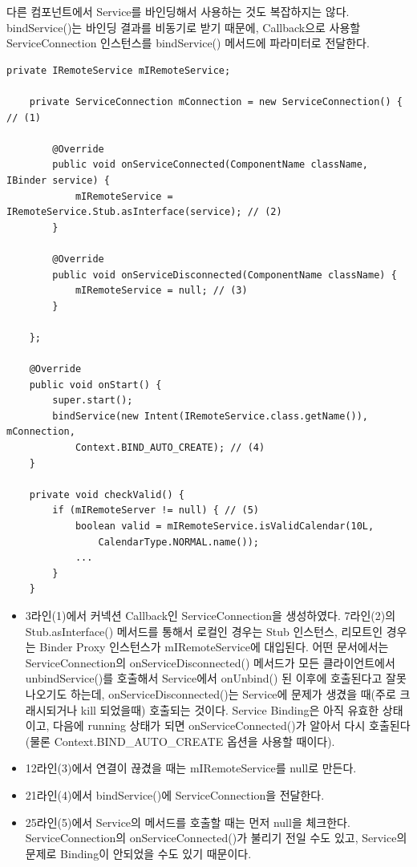 다른 컴포넌트에서 Service를 바인딩해서 사용하는 것도 복잡하지는 않다. 
bindService()는 바인딩 결과를 비동기로 받기 때문에, Callback으로 사용할 ServiceConnection 인스턴스를 bindService() 메서드에 파라미터로 전달한다.
\begin{lstlisting}[frame=single]
	private IRemoteService mIRemoteService;

	private ServiceConnection mConnection = new ServiceConnection() { // (1)

		@Override
    	public void onServiceConnected(ComponentName className, IBinder service) {
        	mIRemoteService = IRemoteService.Stub.asInterface(service); // (2)
    	}

    	@Override
    	public void onServiceDisconnected(ComponentName className) {
        	mIRemoteService = null; // (3)
    	}
    	
	};

	@Override
	public void onStart() {
		super.start();
		bindService(new Intent(IRemoteService.class.getName()), mConnection,
			Context.BIND_AUTO_CREATE); // (4)
	}
	
	private void checkValid() {
		if (mIRemoteServer != null) { // (5)
			boolean valid = mIRemoteService.isValidCalendar(10L,
				CalendarType.NORMAL.name());
			...
		}	
	}
\end{lstlisting}
\begin{itemize}
\item 3라인(1)에서 커넥션 Callback인 ServiceConnection을 생성하였다. 
7라인(2)의 Stub.asInterface() 메서드를 통해서 로컬인 경우는 Stub 인스턴스, 리모트인 경우는 Binder Proxy 인스턴스가 mIRemoteService에 대입된다.
어떤 문서에서는 ServiceConnection의 onServiceDisconnected() 메서드가 모든 클라이언트에서 unbindService()를 호출해서 Service에서 onUnbind() 된 이후에 호출된다고 잘못 나오기도 하는데, onServiceDisconnected()는 Service에 문제가 생겼을 때(주로 크래시되거나 kill 되었을때) 호출되는 것이다.
Service Binding은 아직 유효한 상태이고, 다음에 running 상태가 되면 onServiceConnected()가 알아서 다시 호출된다(물론 Context.BIND\_AUTO\_CREATE 옵션을 사용할 때이다).
\item 12라인(3)에서 연결이 끊겼을 때는 mIRemoteService를 null로 만든다.
\item 21라인(4)에서 bindService()에 ServiceConnection을 전달한다.
\item 25라인(5)에서 Service의 메서드를 호출할 때는 먼저 null을 체크한다. ServiceConnection의 onServiceConnected()가 불리기 전일 수도 있고, Service의 문제로 Binding이 안되었을 수도 있기 때문이다.
\end{itemize}

